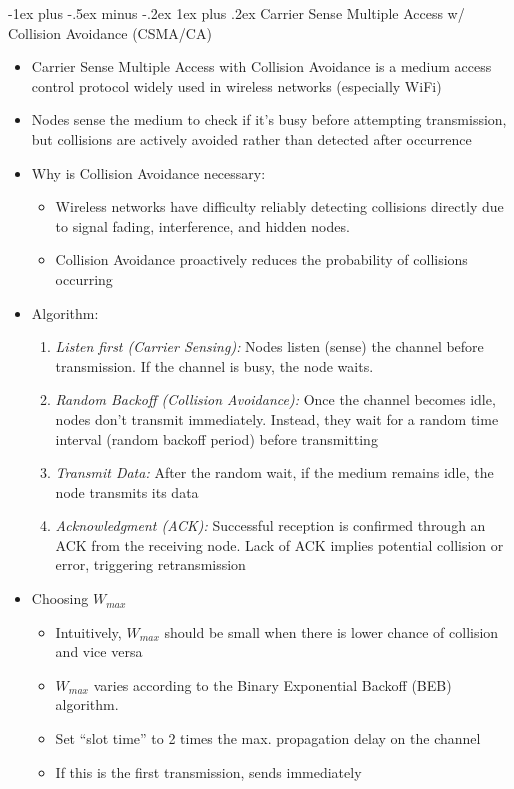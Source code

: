 \documentclass[10pt,landscape]{article}
\makeatletter
\newcommand{\subsubsubsection}{\@startsection{subsubsection}{3}{0mm}%
                                {-1ex plus -.5ex minus -.2ex}%
                                {1ex plus .2ex}%
                                {\normalfont\scriptsize\bfseries}}
\newcommand{\1}{\mathmybb{1}}
\makeatother
\begin{document}
\begin{multicols*}{3}
\subsubsubsection{Carrier Sense Multiple Access w/ Collision Avoidance (CSMA/CA)}
\begin{itemize}
  \item Carrier Sense Multiple Access with Collision Avoidance is a medium access control
  protocol widely used in wireless networks (especially WiFi)
  \item Nodes sense the medium to check if it’s busy before attempting transmission, but
  collisions are actively avoided rather than detected after occurrence 
  \item Why is Collision Avoidance necessary:
  \begin{itemize}
    \item Wireless networks have difficulty reliably detecting collisions directly due to signal
    fading, interference, and hidden nodes.
    \item Collision Avoidance proactively reduces the probability of collisions occurring
  \end{itemize}
  \item Algorithm:
  \begin{enumerate}
    \item \textit{Listen first (Carrier Sensing):} Nodes listen (sense) the channel before transmission. If the channel is busy, the node waits.
    \item \textit{Random Backoff (Collision Avoidance):} Once the channel becomes idle, nodes don’t transmit immediately. Instead, they wait for a random time interval (random backoff period) before transmitting
    \item \textit{Transmit Data:} After the random wait, if the medium remains idle, the node transmits its data
    \item \textit{Acknowledgment (ACK):} Successful reception is confirmed through an ACK from the receiving node. Lack of ACK implies potential collision or error, triggering retransmission
  \end{enumerate}
  \item Choosing $W_{max}$
  \begin{itemize}
    \item Intuitively, $W_{max}$ should be small when there is lower chance of collision
    and vice versa
    \item $W_{max}$ varies according to the Binary Exponential Backoff (BEB) algorithm.
    \item Set “slot time” to 2 times the max. propagation delay on the channel
    \item If this is the first transmission, sends immediately

\end{itemize}
\end{itemize}
\end{multicols*}
\end{document}
